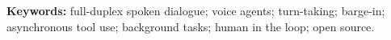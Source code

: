 \documentclass[11pt,a4paper]{article}
\begin{document}
\noindent\textbf{Keywords:} full-duplex spoken dialogue; voice agents; turn-taking; barge-in;
asynchronous tool use; background tasks; human in the loop; open source.











\end{document}
